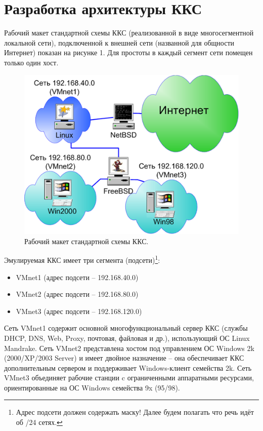 \newpage
\section{Разработка архитектуры ККС}

Рабочий макет стандартной схемы ККС (реализованной в виде многосегментной локальной сети), подключенной к внешней сети (названной для общности Интернет) показан на рисунке 1. Для простоты в каждый сегмент сети помещен только один хост.

\begin{figure}[h!]
\centering
\includegraphics[scale=1]{res/network_general}
\caption{Рабочий макет стандартной схемы ККС.}
\end{figure}

Эмулируемая ККС имеет три сегмента (подсети)\footnote{Адрес подсети должен содержать маску! Далее будем полагать что речь идёт об /24 сетях.}:
\begin{itemize}
\item VMnet1 (адрес подсети – 192.168.40.0)
\item VMnet2 (адрес подсети – 192.168.80.0)
\item VMnet3 (адрес подсети – 192.168.120.0)
\end{itemize}

Сеть VMnet1 содержит основной многофункциональный сервер ККС (службы DHCP, DNS, Web, Proxy, почтовая, файловая и др.), использующий ОС Linux Mandrake. Сеть VMnet2 представлена хостом под управлением ОС Windows 2k (2000/XP/2003 Server) и имеет двойное назначение – она обеспечивает ККС дополнительным сервером и поддерживает Windows-клиент семейства 2k. Сеть VMnet3 объединяет рабочие станции c ограниченными аппаратными ресурсами, ориентированные на ОС Windows семейства 9x (95/98).

